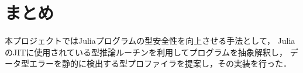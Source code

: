 
\section{まとめ} \label{section:conclusion}

本プロジェクトではJuliaプログラムの型安全性を向上させる手法として，
JuliaのJITに使用されている型推論ルーチンを利用してプログラムを抽象解釈し，
データ型エラーを静的に検出する型プロファイラを提案し，その実装を行った．

